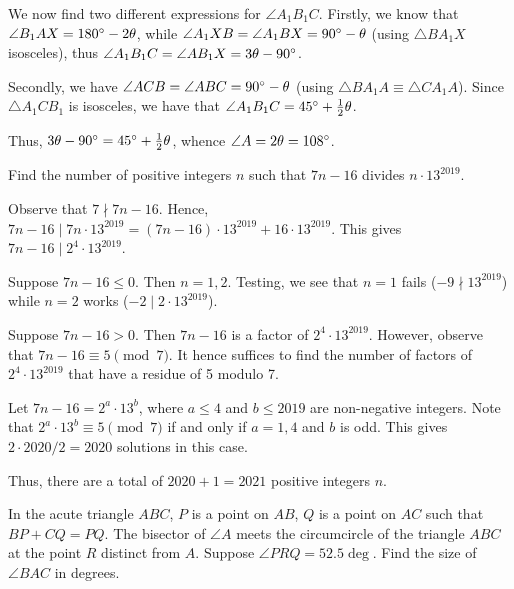 We now find two different expressions for $\angle A_1 B_1 C$. Firstly, we know that $\angle B_1 A X = 180^{\circ} - 2\theta$, while $\angle A_1XB = \angle A_1 B X = 90^{\circ} - \theta$ (using $\triangle B A_1 X$ isosceles), thus $\angle A_1 B_1 C = \angle AB_1 X = 3\theta - 90^{\circ}$.

Secondly, we have $\angle ACB = \angle ABC = 90^{\circ} - \theta$ (using $\triangle BA_1 A \equiv \triangle CA_1 A$). Since $\triangle A_1 C B_1$ is isosceles, we have that $\angle A_1 B_1 C = 45^{\circ} + \frac12 \theta$.

Thus, $3\theta - 90^{\circ} = 45^{\circ} + \frac12 \theta$, whence $\angle A = 2\theta = 108^{\circ}$.

\begin{question}[2021]\label{A::2021-O-1-22}
    Find the number of positive integers $n$ such that $7n-16$ divides $n \cdot 13^{2019}$.
\end{question}

Observe that $7 \nmid 7n - 16$. Hence, $7n-16 \mid 7n \cdot 13^{2019} = (7n-16)\cdot13^{2019} + 16 \cdot 13^{2019}$. This gives $7n - 16 \mid 2^4 \cdot 13^{2019}$.

 Suppose $7n-16 \leq 0$. Then $n = 1, 2$. Testing, we see that $n = 1$ fails ($-9 \nmid 13^{2019}$) while $n = 2$ works ($-2 \mid 2 \cdot 13^{2019}$).

 Suppose $7n-16 > 0$. Then $7n-16$ is a factor of $2^4 \cdot 13^{2019}$. However, observe that $7n - 16 \equiv 5 \pmod 7$. It hence suffices to find the number of factors of $2^4 \cdot 13^{2019}$ that have a residue of 5 modulo 7.

Let $7n-16 = 2^a \cdot 13^b$, where $a \leq 4$ and $b \leq 2019$ are non-negative integers. Note that $2^a \cdot 13^b \equiv 5 \pmod{7}$ if and only if $a = 1, 4$ and $b$ is odd. This gives $2 \cdot 2020/2 = 2020$ solutions in this case.

Thus, there are a total of $2020 + 1 = 2021$ positive integers $n$.

\begin{question}[75]\label{A::2021-O-1-23}
    In the acute triangle $ABC$, $P$ is a point on $AB$, $Q$ is a point on $AC$ such that $BP + CQ = PQ$. The bisector of $\angle A$ meets the circumcircle of the triangle $ABC$ at the point $R$ distinct from $A$. Suppose $\angle PRQ = 52.5\deg$. Find the size of $\angle BAC$ in degrees.
\end{question}

